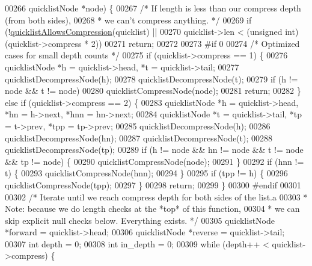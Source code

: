 \begin{DoxyCode}
{00266                                       quicklistNode *node) \{
00267     \textcolor{comment}{/* If length is less than our compress depth (from both sides),}
00268 \textcolor{comment}{     * we can't compress anything. */}
00269     \textcolor{keywordflow}{if} (!\hyperlink{quicklist_8c_afb150d2af7dee66dc2d3303ea5663a6a}{quicklistAllowsCompression}(quicklist) ||
00270         quicklist->len < (\textcolor{keywordtype}{unsigned} \textcolor{keywordtype}{int})(quicklist->compress * 2))
00271         \textcolor{keywordflow}{return};
00272 
00273 \textcolor{preprocessor}{#}\textcolor{preprocessor}{if} 0
00274     \textcolor{comment}{/* Optimized cases for small depth counts */}
00275     \textcolor{keywordflow}{if} (quicklist->compress == 1) \{
00276         quicklistNode *h = quicklist->head, *t = quicklist->tail;
00277         quicklistDecompressNode(h);
00278         quicklistDecompressNode(t);
00279         \textcolor{keywordflow}{if} (h != node && t != node)
00280             quicklistCompressNode(node);
00281         \textcolor{keywordflow}{return};
00282     \} \textcolor{keywordflow}{else} \textcolor{keywordflow}{if} (quicklist->compress == 2) \{
00283         quicklistNode *h = quicklist->head, *hn = h->next, *hnn = hn->next;
00284         quicklistNode *t = quicklist->tail, *tp = t->prev, *tpp = tp->prev;
00285         quicklistDecompressNode(h);
00286         quicklistDecompressNode(hn);
00287         quicklistDecompressNode(t);
00288         quicklistDecompressNode(tp);
00289         \textcolor{keywordflow}{if} (h != node && hn != node && t != node && tp != node) \{
00290             quicklistCompressNode(node);
00291         \}
00292         \textcolor{keywordflow}{if} (hnn != t) \{
00293             quicklistCompressNode(hnn);
00294         \}
00295         \textcolor{keywordflow}{if} (tpp != h) \{
00296             quicklistCompressNode(tpp);
00297         \}
00298         \textcolor{keywordflow}{return};
00299     \}
00300 \textcolor{preprocessor}{#}\textcolor{preprocessor}{endif}
00301 
00302     \textcolor{comment}{/* Iterate until we reach compress depth for both sides of the list.a}
00303 \textcolor{comment}{     * Note: because we do length checks at the *top* of this function,}
00304 \textcolor{comment}{     *       we can skip explicit null checks below. Everything exists. */}
00305     quicklistNode *forward = quicklist->head;
00306     quicklistNode *reverse = quicklist->tail;
00307     \textcolor{keywordtype}{int} depth = 0;
00308     \textcolor{keywordtype}{int} in\_depth = 0;
00309     \textcolor{keywordflow}{while} (depth++ < quicklist->compress) \{
}
\end{DoxyCode}
